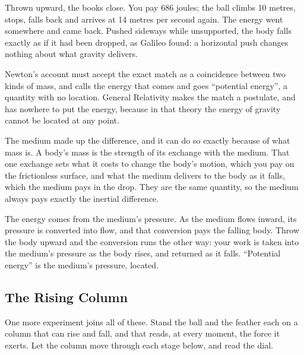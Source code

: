 Thrown upward, the books close. You pay 686 joules; the ball climbs 10 metres, stops, falls back and arrives at 14 metres per second again. The energy went somewhere and came back. Pushed sideways while unsupported, the body falls exactly as if it had been dropped, as Galileo found: a horizontal push changes nothing about what gravity delivers.

Newton's account must accept the exact match as a coincidence between two kinds of mass, and calls the energy that comes and goes ``potential energy'', a quantity with no location. General Relativity makes the match a postulate, and has nowhere to put the energy, because in that theory the energy of gravity cannot be located at any point. 

\begin{hypbar}
The medium made up the difference, and it can do so exactly because of what mass is. A body's mass is the strength of its exchange with the medium. That one exchange sets what it costs to change the body's motion, which you pay on the frictionless surface, and what the medium delivers to the body as it falls, which the medium pays in the drop. They are the same quantity, so the medium always pays exactly the inertial difference.

The energy comes from the medium's pressure. As the medium flows inward, its pressure is converted into flow, and that conversion pays the falling body. Throw the body upward and the conversion runs the other way: your work is taken into the medium's pressure as the body rises, and returned as it falls. ``Potential energy'' is the medium's pressure, located.
\end{hypbar}

\subsection*{The Rising Column}

One more experiment joins all of these. Stand the ball and the feather each on a column that can rise and fall, and that reads, at every moment, the force it exerts. Let the column move through each stage below, and read the dial.

